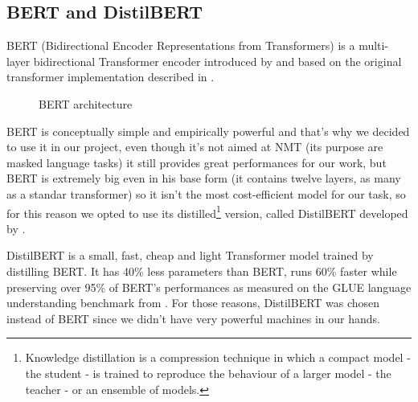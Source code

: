 \subsection{BERT and DistilBERT}\label{subsec:bert}
BERT (Bidirectional Encoder Representations from Transformers) is a multi-layer bidirectional Transformer encoder introduced by \cite{devlin2018bert} and  based on the original transformer implementation described in \cite{vaswani2017attention}.
\begin{figure}[H]%
    \centering
    \caption{BERT architecture}
    \label{fig:bert}%
\end{figure}
BERT is conceptually simple and empirically powerful and that's why we decided to use it in our project, even though it's not aimed at NMT (its purpose are masked language tasks) it still provides great performances for our work, but BERT is extremely big even in his base form (it contains twelve layers, as many as a standar transformer) so it isn't the most cost-efficient model for our task, so for this reason we opted to use its distilled\footnote{Knowledge distillation is a compression technique in which a compact model - the student - is trained to reproduce the behaviour of a larger model - the teacher - or an ensemble of models.} version, called DistilBERT developed by \cite{sanh2019distilbert}.
\vspace{3mm}

DistilBERT is a small, fast, cheap and light Transformer model trained by distilling BERT. It has 40\% less parameters than BERT, runs 60\% faster while preserving over 95\% of BERT’s performances as measured on the GLUE language understanding benchmark from \cite{wang2018glue}. For those reasons, DistilBERT was chosen instead of BERT since we didn't have very powerful machines in our hands.

